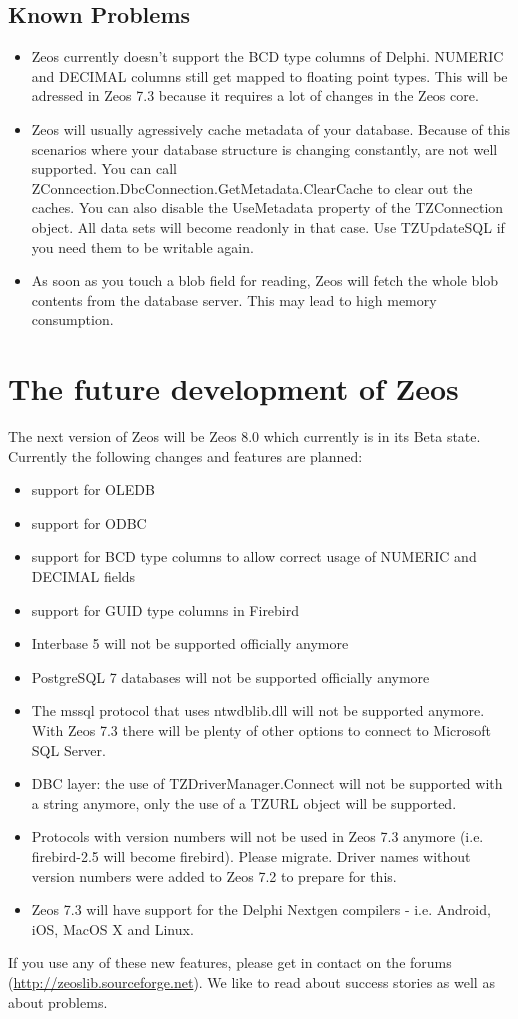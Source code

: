 \documentclass[a4paper,12pt,oneside]{book}
\begin{document}
\section{Known Problems}
\label{sec:Rev4_KnownProblems}
\begin{itemize}
\item 
  Zeos currently doesn't support the BCD type columns of Delphi.
	NUMERIC and DECIMAL columns still get mapped to floating point types.
	This will be adressed in Zeos 7.3 because it requires a lot of changes in the Zeos core.
\item
  Zeos will usually agressively cache metadata of your database.
	Because of this scenarios where your database structure is changing constantly, are not well supported.
	You can call ZConncection.\-DbcConnection.\-GetMetadata.\-ClearCache to clear out the caches.
	You can also disable the UseMetadata property of the TZConnection object.
	All data sets will become readonly in that case.
	Use TZUpdateSQL if you need them to be writable again.
\item
  As soon as you touch a blob field for reading, Zeos will fetch the whole blob contents from the database server.
	This may lead to high memory consumption.
\end{itemize}

\chapter{The future development of Zeos}
\label{chap:FutureDevelopmentOfZeosRev}
The next version of Zeos will be Zeos 8.0 which currently is in its Beta state.
Currently the following changes and features are planned:
\begin{itemize}
\item support for OLEDB
\item support for ODBC
\item support for BCD type columns to allow correct usage of NUMERIC and DECIMAL fields
\item support for GUID type columns in Firebird
\item Interbase 5 will not be supported officially anymore
\item PostgreSQL 7 databases will not be supported officially anymore
\item 
  The mssql protocol that uses ntwdblib.dll will not be supported anymore.
  With Zeos 7.3 there will be plenty of other options to connect to Microsoft SQL Server.
\item DBC layer: the use of TZDriverManager.Connect will not be supported with a string anymore, only the use of a TZURL object will be supported.
\item
  Protocols with version numbers will not be used in Zeos 7.3 anymore (i.e. firebird-2.5 will become firebird).
  Please migrate.
  Driver names without version numbers were added to Zeos 7.2 to prepare for this.
\item
  Zeos 7.3 will have support for the Delphi Nextgen compilers - i.e. Android, iOS, MacOS X and Linux.
\end{itemize}
If you use any of these new features, please get in contact on the forums (\url{http://zeoslib.sourceforge.net}).
We like to read about success stories as well as about problems.
\end{document}
